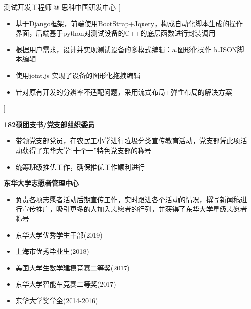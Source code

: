 \documentclass[zh]{resume}
\begin{document}
\begin{experiences}
    {测试开发工程师 @ 思科中国研发中心}%
    [\begin{itemize}
      \item 基于Django框架，前端使用BootStrap+Jquery，构成自动化脚本生成的操作界面，后端基于python对测试设备的C++的底层函数进行封装调用
      \item 根据用户需求，设计并实现测试设备的多模式编辑：a.图形化操作 b.JSON脚本编辑
      \item 使用joint.js 实现了设备的图形化拖拽编辑
      \item 针对原有开发的分辨率不适配问题，采用流式布局+弹性布局的解决方案
    \end{itemize}] 
\end{experiences}


\textbf{182硕团支书/党支部组织委员}
\begin{itemize}
  \item 带领党支部党员，在农民工小学进行垃圾分类宣传教育活动，党支部凭此项活动获得了东华大学“十个一”特色党支部的称号
  \item 统筹班级推优工作，确保推优工作顺利进行
\end{itemize}

\textbf{ 东华大学志愿者管理中心}
\begin{itemize}
  \item 负责各项志愿者活动后期宣传工作，实时跟进各个活动的情况，撰写新闻稿进行宣传推广，吸引更多的人加入志愿者的行列，并获得了东华大学星级志愿者称号 
\end{itemize}

\begin{itemize}
  \item 东华大学优秀学生干部(2019)
  \item 上海市优秀毕业生(2018)
  \item 美国大学生数学建模竞赛二等奖(2017)
  \item 东华大学智能车竞赛二等奖(2017)
  \item 东华大学奖学金(2014-2016)
\end{itemize}
\end{document}
